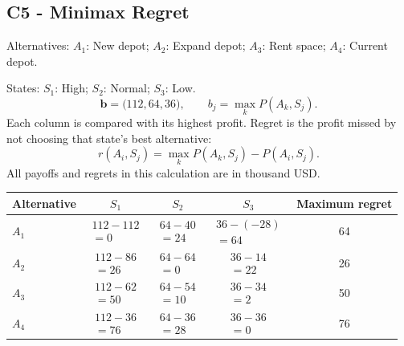 \subsection*{C5 - Minimax Regret }
\label{sol:parcel-depot-c5}
Alternatives: $A_1$: New depot; $A_2$: Expand depot; $A_3$: Rent space; $A_4$: Current depot.\par
States: $S_1$: High; $S_2$: Normal; $S_3$: Low.
\[\boldsymbol{b}=\bigl(112,64,36\bigr),\qquad b_j=\max_k P(A_k,S_j).\]
Each column is compared with its highest profit. Regret is the profit missed by not choosing that state's best alternative:
\[r(A_i,S_j)=\max_k P(A_k,S_j)-P(A_i,S_j).\]
All payoffs and regrets in this calculation are in thousand USD.
\begin{center}
\begin{tabular}{@{}lcccc@{}}\toprule
Alternative & $S_1$ & $S_2$ & $S_3$ & Maximum regret\\\midrule
$A_1$ & $\begin{gathered}112-112\\=0\end{gathered}$ & $\begin{gathered}64-40\\=24\end{gathered}$ & $\begin{gathered}36-(-28)\\=64\end{gathered}$ & 64\\
$A_2$ & $\begin{gathered}112-86\\=26\end{gathered}$ & $\begin{gathered}64-64\\=0\end{gathered}$ & $\begin{gathered}36-14\\=22\end{gathered}$ & 26\\
$A_3$ & $\begin{gathered}112-62\\=50\end{gathered}$ & $\begin{gathered}64-54\\=10\end{gathered}$ & $\begin{gathered}36-34\\=2\end{gathered}$ & 50\\
$A_4$ & $\begin{gathered}112-36\\=76\end{gathered}$ & $\begin{gathered}64-36\\=28\end{gathered}$ & $\begin{gathered}36-36\\=0\end{gathered}$ & 76\\
\bottomrule\end{tabular}
\end{center}
